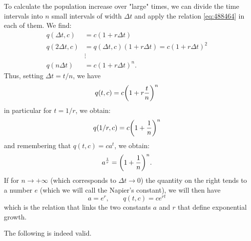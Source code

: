 To calculate the population increase over "large" times, we can
divide the time intervals into $n$ small intervals of width
$\Delta t$ and apply the relation \eqref{eq:488464} in each of them.
We find:
\begin{align*}
 q(\Delta t,c) &= c(1+r\Delta t) \\
 q(2\Delta t,c) &= q(\Delta t,c) (1+r\Delta t)  = c(1+r\Delta t)^2\\
 &\vdots \\
 q(n\Delta t) &= c(1+r\Delta t)^n.
\end{align*}
Thus, setting $\Delta t=t/n$, we have
\[
  q(t,c) = c{\left( 1+r\frac{t}{n} \right)}^n
\]
in particular for $t=1/r$, we obtain:
\[
  q(1/r,c) = c{\left( 1+\frac{1}{n} \right)}^n
\]
and remembering that $q(t,c)=c a^t$, we obtain:
\[
  a^{\frac 1 r} = {\left( 1+\frac{1}{n} \right)}^n.
\]
If for $n\to +\infty$ (which corresponds to $\Delta t \to 0$)
the quantity on the right tends to a number $e$ (which we will call the Napier's
constant), we will then have
\[
  a = e^r, \qquad q(t,c) = c e^{rt}
\]
which is the relation that links the two constants $a$ and $r$ that define
exponential growth.

The following is indeed valid.

